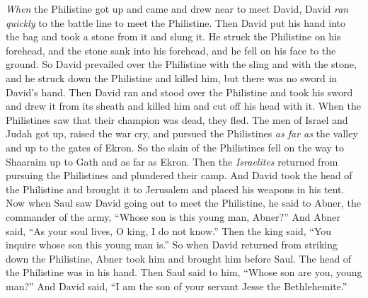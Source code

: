 \begin{biblechapter}
 \textit{When} the Philistine got up and came and drew near to meet David, David \textit{ran quickly} to the battle line to meet the Philistine.
\verse Then David put his hand into the bag and took a stone from it and slung it. He struck the Philistine on his forehead, and the stone sank into his forehead, and he fell on his face to the ground.
\verse So David prevailed over the Philistine with the sling and with the stone, and he struck down the Philistine and killed him, but there was no sword in David’s hand.
\verse Then David ran and stood over the Philistine and took his sword and drew it from its sheath and killed him and cut off his head with it. When the Philistines saw that their champion was dead, they fled.
\verse The men of Israel and Judah got up, raised the war cry, and pursued the Philistines \textit{as far as} the valley and up to the gates of Ekron. So the slain of the Philistines fell on the way to Shaaraim up to Gath and as far as Ekron.
\verse Then the \textit{Israelites} returned from pursuing the Philistines and plundered their camp.
\verse And David took the head of the Philistine and brought it to Jerusalem and placed his weapons in his tent.
\verse Now when Saul saw David going out to meet the Philistine, he said to Abner, the commander of the army, “Whose son is this young man, Abner?” And Abner said, “As your soul lives, O king, I do not know.”
\verse Then the king said, “You inquire whose son this young man is.”
\verse So when David returned from striking down the Philistine, Abner took him and brought him before Saul. The head of the Philistine was in his hand.
\verse Then Saul said to him, “Whose son are you, young man?” And David said, “I am the son of your servant Jesse the Bethlehemite.”
\end{biblechapter}


